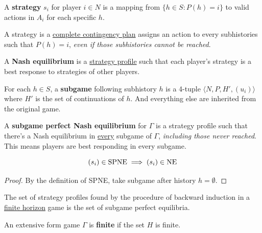 \documentclass[11pt]{article}
\begin{document}
			\begin{definition}
				A \textbf{strategy} $s_i$ for player $i \in N$ is a mapping from $\{h \in S: P(h) = i\}$ to valid actions in $A_i$ for each specific $h$.
			\end{definition}
			
			\begin{remark}
				A strategy is a \ul{complete contingency plan} assigns an action to every subhistories such that $P(h) = i$, \emph{even if those subhistories cannot be reached}.
			\end{remark}
			
			\begin{definition}
				A \textbf{Nash equilibrium} is a \ul{strategy profile} such that each player's strategy is a best response to strategies of other players.
			\end{definition}
			
			\begin{definition}
				For each $h \in S$, a \textbf{subgame} following subhistory $h$ is a 4-tuple $\langle N, P, H', (u_i) \rangle$ where $H'$ is the set of continuations of $h$. And everything else are inherited from the original game.
			\end{definition}
			
			\begin{definition}
				A \textbf{subgame perfect Nash equilibrium} for $\Gamma$ is a strategy profile such that there's a Nash equilibrium in \ul{every} subgame of $\Gamma$, \emph{including those never reached}. This means players are best responding in every subgame.
			\end{definition}
			
			\begin{lemma}
				\begin{equation}
					(s_i) \in \text{{SPNE}} \implies (s_i) \in \text{{NE}}
				\end{equation}
				\begin{proof}
					By the definition of SPNE, take subgame after history $h = \emptyset$.
				\end{proof}
			\end{lemma}
			
			\begin{proposition}
				The set of strategy profiles found by the procedure of backward induction in a \ul{finite horizon} game is the set of subgame perfect equilibria.
			\end{proposition}
			
			\begin{definition}
				An extensive form game $\Gamma$ is \textbf{finite} if the set $H$ is finite.
			\end{definition}
			
\end{document}
